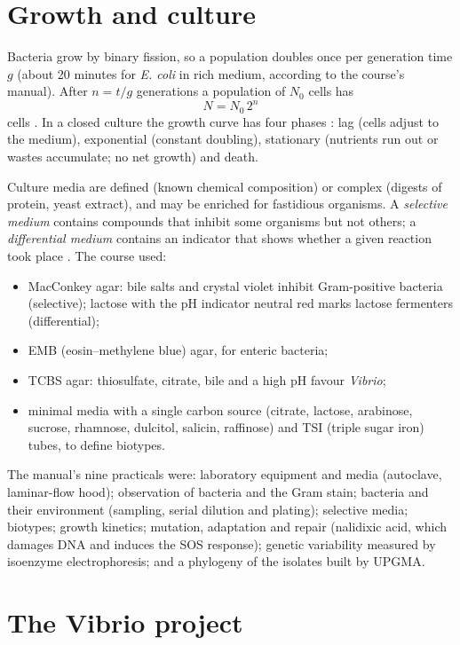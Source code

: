 \section{Growth and culture}
\label{section-growth}

Bacteria grow by binary fission, so a
population doubles once per generation time
$g$ (about 20 minutes for \emph{E. coli} in
rich medium, according to the course's
manual). After $n = t/g$ generations a
population of $N_0$ cells has
$$
N = N_0 \, 2^{n}
$$
cells \cite[Sections
5.5--5.6]{madigan2012brock}. In a closed
culture the growth curve has four phases
\cite[Section 5.7]{madigan2012brock}: lag
(cells adjust to the medium), exponential
(constant doubling), stationary (nutrients
run out or wastes accumulate; no net growth)
and death.

Culture media are defined (known chemical
composition) or complex (digests of protein,
yeast extract), and may be enriched for
fastidious organisms. A \emph{selective
medium} contains compounds that inhibit some
organisms but not others; a
\emph{differential medium} contains an
indicator that shows whether a given reaction
took place \cite[Section
4.2]{madigan2012brock}. The course used:
\begin{itemize}
\item MacConkey agar: bile salts and crystal
violet inhibit Gram-positive bacteria
(selective); lactose with the pH indicator
neutral red marks lactose fermenters
(differential);
\item EMB (eosin--methylene blue) agar, for
enteric bacteria;
\item TCBS agar: thiosulfate, citrate, bile
and a high pH favour \emph{Vibrio};
\item minimal media with a single carbon
source (citrate, lactose, arabinose, sucrose,
rhamnose, dulcitol, salicin, raffinose) and
TSI (triple sugar iron) tubes, to define
biotypes.
\end{itemize}

The manual's nine practicals were: laboratory
equipment and media (autoclave, laminar-flow
hood); observation of bacteria and the Gram
stain; bacteria and their environment
(sampling, serial dilution and plating);
selective media; biotypes; growth kinetics;
mutation, adaptation and repair (nalidixic
acid, which damages DNA and induces the SOS
response); genetic variability measured by
isoenzyme electrophoresis; and a phylogeny of
the isolates built by UPGMA.

\section{The Vibrio project}
\label{section-vibrio-project}

